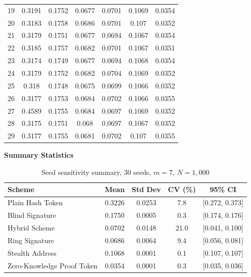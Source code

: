 \begin{longtable}{ccccccc}
19 & 0.3191 & 0.1752 & 0.0677 & 0.0701 & 0.1069 & 0.0354 \\
20 & 0.3183 & 0.1758 & 0.0686 & 0.0701 & 0.107 & 0.0352 \\
21 & 0.3179 & 0.1751 & 0.0677 & 0.0694 & 0.1067 & 0.0354 \\
22 & 0.3185 & 0.1757 & 0.0682 & 0.0701 & 0.1067 & 0.0351 \\
23 & 0.3174 & 0.1749 & 0.0677 & 0.0694 & 0.1068 & 0.0354 \\
24 & 0.3179 & 0.1752 & 0.0682 & 0.0704 & 0.1069 & 0.0352 \\
25 & 0.318 & 0.1748 & 0.0675 & 0.0699 & 0.1066 & 0.0352 \\
26 & 0.3177 & 0.1753 & 0.0684 & 0.0702 & 0.1066 & 0.0355 \\
27 & 0.4589 & 0.1755 & 0.0684 & 0.0697 & 0.1069 & 0.0352 \\
28 & 0.3175 & 0.1751 & 0.068 & 0.0697 & 0.1067 & 0.0352 \\
29 & 0.3177 & 0.1755 & 0.0681 & 0.0702 & 0.107 & 0.0355 \\
\end{longtable}

\vspace{1em}
\noindent\textbf{Summary Statistics}

\begin{table}[H]
\centering
\caption{Seed sensitivity summary, 30 seeds, $m=7$, $N=1{,}000$}
\begin{tabular}{lcccc}
\toprule
\textbf{Scheme} & \textbf{Mean} & \textbf{Std Dev} &
\textbf{CV (\%)} & \textbf{95\% CI}\\
\midrule
Plain Hash Token & 0.3226 & 0.0253 & 7.8  & [0.272, 0.373]\\
Blind Signature  & 0.1750 & 0.0005 & 0.3  & [0.174, 0.176]\\
Hybrid Scheme    & 0.0702 & 0.0148 & 21.0 & [0.041, 0.100]\\
Ring Signature   & 0.0686 & 0.0064 & 9.4  & [0.056, 0.081]\\
Stealth Address  & 0.1068 & 0.0001 & 0.1  & [0.107, 0.107]\\
Zero-Knowledge Proof Token        & 0.0354 & 0.0001 & 0.3  & [0.035, 0.036]\\
\bottomrule
\end{tabular}
\end{table}